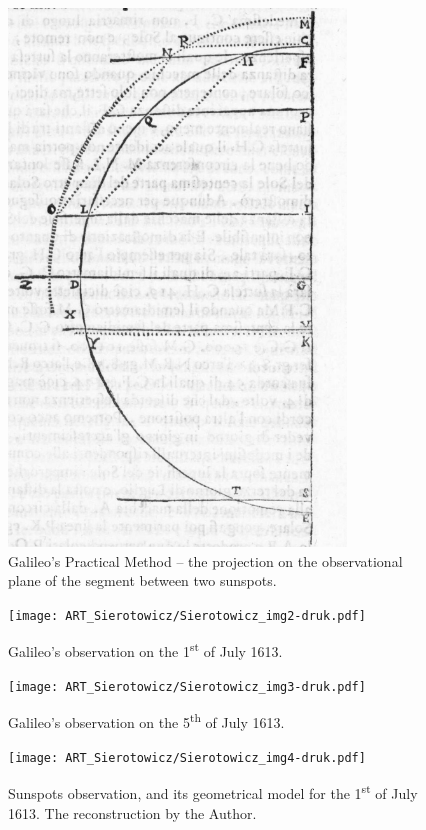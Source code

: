 \begin{artengenv}
\begin{figure}[h]
	\centering
	\includegraphics[width=0.8\textwidth]{ART_Sierotowicz/Sierotowicz_img1-druk.pdf} 
	\caption{Galileo’s Practical Method -- the projection on the observational plane of the segment between two sunspots.}
	\label{sier-fig1}
\end{figure}

\begin{figure}[h]
	\centering
	\texttt{[image: ART\_Sierotowicz/Sierotowicz\_img2-druk.pdf]} 
	\caption{Galileo’s observation on the 1\textsuperscript{st} of July 1613.}
	\label{sier-fig2}
\end{figure}

\begin{figure}[h]
	\centering
	\texttt{[image: ART\_Sierotowicz/Sierotowicz\_img3-druk.pdf]} 
	\caption{Galileo’s observation on the 5\textsuperscript{th} of July 1613.}
	\label{sier-fig3}
\end{figure}

\begin{figure}[h]
	\centering
	\texttt{[image: ART\_Sierotowicz/Sierotowicz\_img4-druk.pdf]} 
	\caption{Sunspots observation, and its geometrical model for the 1\textsuperscript{st} of July 1613. The reconstruction
		by the Author.}
	\label{sier-fig4}
\end{figure}


\end{artengenv}
